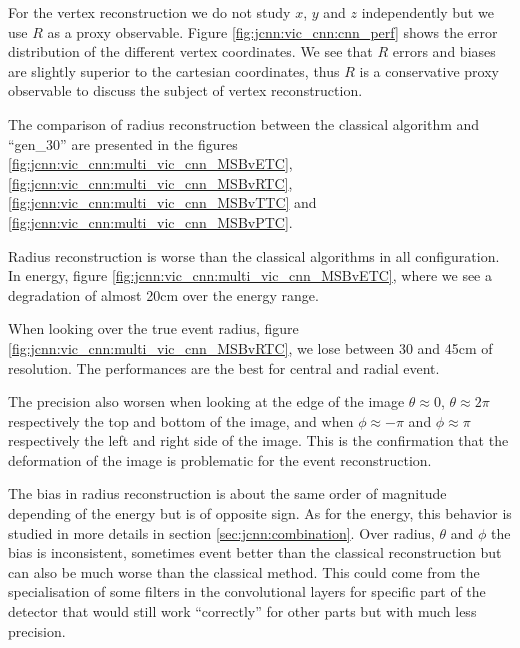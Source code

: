 \documentclass[../main.tex]{subfiles}
\begin{document}
For the vertex reconstruction we do not study $x$, $y$ and $z$ independently but we use $R$ as a proxy observable. Figure \ref{fig:jcnn:vic_cnn:cnn_perf} shows the error distribution of the different vertex coordinates. We see that $R$ errors and biases are slightly superior to the cartesian coordinates, thus $R$ is a conservative proxy observable to discuss the subject of vertex reconstruction.

The comparison of radius reconstruction between the classical algorithm and ``gen\_30'' are presented in the figures \ref{fig:jcnn:vic_cnn:multi_vic_cnn_MSBvETC}, \ref{fig:jcnn:vic_cnn:multi_vic_cnn_MSBvRTC}, \ref{fig:jcnn:vic_cnn:multi_vic_cnn_MSBvTTC} and \ref{fig:jcnn:vic_cnn:multi_vic_cnn_MSBvPTC}.

Radius reconstruction is worse than the classical algorithms in all configuration. In energy, figure \ref{fig:jcnn:vic_cnn:multi_vic_cnn_MSBvETC}, where we see a degradation of almost 20cm over the energy range.

When looking over the true event radius, figure \ref{fig:jcnn:vic_cnn:multi_vic_cnn_MSBvRTC}, we lose between 30 and 45cm of resolution. The performances are the best for central and radial event.

The precision also worsen when looking at the edge of the image $\theta \approx 0$, $\theta \approx 2\pi$ respectively the top and bottom of the image, and when $\phi \approx -\pi$ and $\phi \approx \pi$ respectively the left and right side of the image. This is the confirmation that the deformation of the image is problematic for the event reconstruction.

The bias in radius reconstruction is about the same order of magnitude depending of the energy but is of opposite sign. As for the energy, this behavior is studied in more details in section \ref{sec:jcnn:combination}. Over radius, $\theta$ and $\phi$ the bias is inconsistent, sometimes event better than the classical reconstruction but can also be much worse than the classical method. This could come from the specialisation of some filters in the convolutional layers for specific part of the detector that would still work ``correctly'' for other parts but with much less precision.
\end{document}
